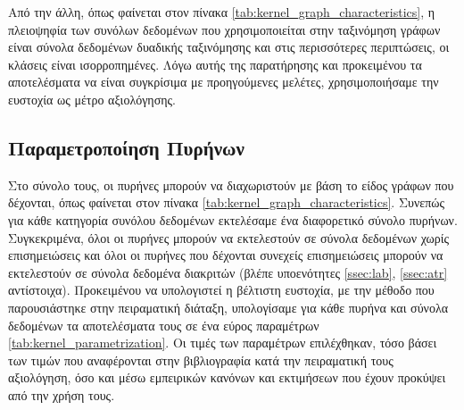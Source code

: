 \begin{table}[]
\centering
{}
\caption{Πίνακας σύγχυσης για ένα πρόβλημα δυαδικής ταξινόμησης.}
\label{tab:conf_mat}
\end{table}
Από την άλλη, όπως φαίνεται στον πίνακα \ref{tab:kernel_graph_characteristics}, η πλειοψηφία των συνόλων δεδομένων που χρησιμοποιείται στην ταξινόμηση γράφων είναι σύνολα δεδομένων δυαδικής ταξινόμησης και στις περισσότερες περιπτώσεις, οι κλάσεις είναι ισορροπημένες.
Λόγω αυτής της παρατήρησης και προκειμένου τα αποτελέσματα να είναι συγκρίσιμα με προηγούμενες μελέτες, χρησιμοποιήσαμε την ευστοχία ως μέτρο αξιολόγησης.

\subsection{Παραμετροποίηση Πυρήνων}
Στο σύνολο τους, οι πυρήνες μπορούν να διαχωριστούν με βάση το είδος γράφων που δέχονται, όπως φαίνεται στον πίνακα \ref{tab:kernel_graph_characteristics}.
Συνεπώς για κάθε κατηγορία συνόλου δεδομένων εκτελέσαμε ένα διαφορετικό σύνολο πυρήνων.
Συγκεκριμένα, όλοι οι πυρήνες μπορούν να εκτελεστούν σε σύνολα δεδομένων χωρίς επισημειώσεις και όλοι οι πυρήνες που δέχονται συνεχείς επισημειώσεις μπορούν να εκτελεστούν σε σύνολα δεδομένα διακριτών (βλέπε υποενότητες \ref{ssec:lab}, \ref{ssec:atr} αντίστοιχα).
Προκειμένου να υπολογιστεί η βέλτιστη ευστοχία, με την μέθοδο που παρουσιάστηκε στην πειραματική διάταξη, υπολογίσαμε για κάθε πυρήνα και σύνολα δεδομένων τα αποτελέσματα τους σε ένα εύρος παραμέτρων \ref{tab:kernel_parametrization}.
Οι τιμές των παραμέτρων επιλέχθηκαν, τόσο βάσει των τιμών που αναφέρονται στην βιβλιογραφία κατά την πειραματική τους αξιολόγηση, όσο και μέσω εμπειρικών κανόνων και εκτιμήσεων που έχουν προκύψει από την χρήση τους.

